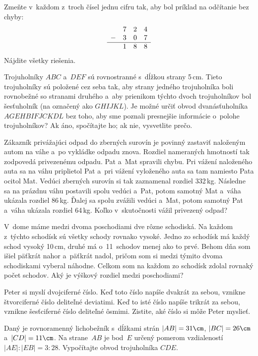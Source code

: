 {%
Zmeňte v~každom z~troch čísel jednu cifru tak, aby bol príklad na odčítanie bez chyby:
$$
\begin{array}{rrrr}
 & 7 & 2 & 4 \\
- & 3 & 0 & 7 \\
\hline
 & 1 & 8 & 8 \\
\end{array}
$$
Nájdite všetky riešenia.}

{%
Trojuholníky $ABC$ a~$DEF$ sú rovnostranné s~dĺžkou strany 5\,cm.
Tieto trojuholníky sú položené cez seba tak, aby strany jedného
trojuholníka boli rovnobežné so stranami druhého a~aby prienikom týchto
dvoch trojuholníkov bol šesťuholník (na \obr{} označený ako $GHIJKL$).
%
Je možné určiť obvod dvanásťuholníka $AGEHBIFJCKDL$ bez toho,
aby sme poznali presnejšie informácie o~polohe trojuholníkov?
Ak áno, spočítajte ho; ak nie, vysvetlite prečo.}

{%
Zákazník privážajúci odpad do zberných surovín je povinný zastaviť naloženým
autom na váhe a~po vykládke odpadu znova.
Rozdiel nameraných hmotností tak zodpovedá privezenému odpadu.
Pat a~Mat spravili chybu.
Pri vážení naloženého auta sa na váhu priplietol Pat a~pri vážení vyloženého
auta sa tam namiesto Pata ocitol Mat.
Vedúci zberných surovín si tak zaznamenal rozdiel 332\,kg.
Následne sa na prázdnu váhu postavili spolu vedúci a~Pat, potom samotný
Mat a~váha ukázala rozdiel 86\,kg.
Ďalej sa spolu zvážili vedúci a~Mat, potom samotný Pat a~váha ukázala rozdiel
64\,kg.
Koľko v~skutočnosti vážil privezený odpad?
}

{%
V~dome máme medzi dvoma poschodiami dve rôzne schodiská.
Na každom z~týchto schodísk sú všetky schody rovnako vysoké.
Jedno zo schodísk má každý schod vysoký 10\,cm, druhé má o~11~schodov menej
ako to prvé.
Behom dňa som išiel päťkrát nahor a~päťkrát nadol, pričom som si medzi
týmito dvoma schodiskami vyberal náhodne.
Celkom som na každom zo schodísk zdolal rovnaký počet schodov.
Aký je výškový rozdiel medzi poschodiami?
}

{%
Peter si myslí dvojciferné číslo.
Keď toto číslo napíše dvakrát za sebou, vznikne štvorciferné číslo deliteľné deviatimi.
Keď to isté číslo napíše trikrát za sebou, vznikne šesťciferné číslo deliteľné ôsmimi.
Zistite, aké číslo si môže Peter myslieť.}

{%
Daný je rovnoramenný lichobežník s~dĺžkami strán $|AB|=31\cm$, $|BC|=26\cm$
a~$|CD|=11\cm$.
Na strane~$AB$ je bod~$E$ určený pomerom vzdialeností $|AE|:|EB|=3:28$.
Vypočítajte obvod trojuholníka $CDE$.}

